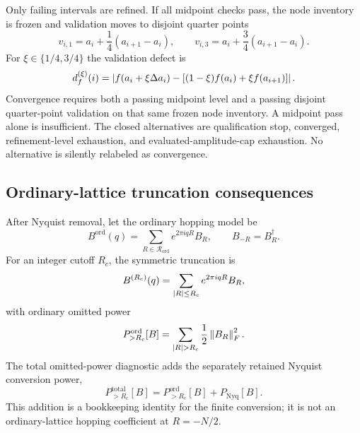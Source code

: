 Only failing intervals are refined.  If all midpoint checks pass, the node inventory is
frozen and validation moves to disjoint quarter points
\begin{equation}
 v_{i,1}=a_i+\frac14(a_{i+1}-a_i),
 \qquad
 v_{i,3}=a_i+\frac34(a_{i+1}-a_i).
 \label{eq:quarter-points}
\end{equation}
For $\xi\in\{1/4,3/4\}$ the validation defect is
\begin{equation}
 d_f^{(\xi)}(i)
 =\left\lvert f(a_i+\xi\Delta a_i)
       -[(1-\xi)f(a_i)+\xi f(a_{i+1})]\right\rvert.
 \label{eq:quarter-defect}
\end{equation}
Convergence requires both a passing midpoint level and a passing disjoint quarter-point
validation on that same frozen node inventory.  A midpoint pass alone is insufficient.
The closed alternatives are qualification stop, converged, refinement-level exhaustion,
and evaluated-amplitude-cap exhaustion.  No alternative is silently relabeled as
convergence.

\subsection{Ordinary-lattice truncation consequences}

After Nyquist removal, let the ordinary hopping model be
\begin{equation}
 B^{\mathrm{ord}}(q)=\sum_{R\in\mathcal R_{\mathrm{ord}}}
 e^{2\pi iqR}B_R,
 \qquad B_{-R}=B_R^\dagger.
 \label{eq:ordinary-model}
\end{equation}
For an integer cutoff $R_c$, the symmetric truncation is
\begin{equation}
 B^{(R_c)}(q)=\sum_{\left\lvert R\right\rvert\le R_c}e^{2\pi iqR}B_R,
 \label{eq:truncated-model}
\end{equation}
with ordinary omitted power
\begin{equation}
 P_{>R_c}^{\mathrm{ord}}[B]
 =\sum_{\left\lvert R\right\rvert>R_c}\frac12\left\lVert B_R\right\rVert_F^2.
 \label{eq:ordinary-omitted-power}
\end{equation}
The total omitted-power diagnostic adds the separately retained Nyquist conversion power,
\begin{equation}
 P_{>R_c}^{\mathrm{total}}[B]
 =P_{>R_c}^{\mathrm{ord}}[B]+P_{\mathrm{Nyq}}[B].
 \label{eq:total-omitted-power}
\end{equation}
This addition is a bookkeeping identity for the finite conversion; it is not an
ordinary-lattice hopping coefficient at $R=-N/2$.

